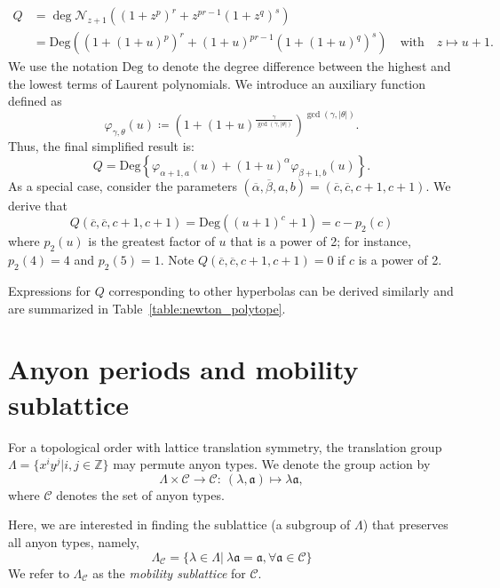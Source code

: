 \documentclass[aps,prl,english,superscriptaddress,twocolumn,tightenlines,showpacs,longbibliography,floatfix,amsfonts]{revtex4-2}
\begin{document}
\begin{align}
	Q &= \deg\mathcal{N}_{z+1}\left((1+z^p)^r+z^{pr-1}(1+z^q)^s\right) \\
	&= \text{Deg} \left((1+(1+u)^p)^r + (1+u)^{pr-1}(1+(1+u)^q)^s\right) \quad \text{with}\quad z \mapsto u+1.
\end{align}
We use the notation $\text{Deg}$ to denote the degree difference between the highest and the lowest terms of Laurent polynomials. We introduce an auxiliary function defined as
\begin{equation}
	\varphi_{\gamma,\theta}(u) \coloneqq \left(1+(1+u)^{\frac{\gamma}{\gcd(\gamma, |\theta|)}}\right)^{\gcd(\gamma, |\theta|)}.
\end{equation}
Thus, the final simplified result is:
\begin{equation}
	Q = \text{Deg}\left\{\varphi_{\alpha+1,a}(u)+(1+u)^\alpha\varphi_{\beta+1,b}(u)\right\}.
\end{equation}
As a special case, consider the parameters $(\overline{\alpha}, \overline{\beta}, a, b) = (\overline{c},\overline{c},c+1,c+1)$. We derive that
\begin{equation}
	Q(\overline{c},\overline{c},c+1,c+1)=\text{Deg}\left((u+1)^c+1\right) = c - p_2(c)
\end{equation}
where $p_2(u)$ is the greatest factor of $u$ that is a power of 2; for instance, $p_2(4)=4$ and $p_2(5)=1$. 
Note $Q(\overline{c},\overline{c},c+1,c+1)=0$ if $c$ is a power of 2.

Expressions for $Q$ corresponding to other hyperbolas can be derived similarly and are summarized in Table~\ref{table:newton_polytope}.


\section{Anyon periods and mobility sublattice}\label{app:anyon_periods}

For a topological order with lattice translation symmetry, the translation group $\Lambda=\{x^iy^j | i,j\in\mathbb{Z}\}$ may permute anyon types. We denote the group action by 
\begin{equation}
	\Lambda \times \mathscr{C} \to \mathscr{C}:\  (\lambda, \mathfrak{a}) \mapsto \lambda \mathfrak{a},
\end{equation}
where $\mathscr{C}$ denotes the set of anyon types. 

Here, we are interested in finding the sublattice (a subgroup of $\Lambda$) that preserves all anyon types, namely,
\begin{equation}
	\Lambda_\mathscr{C}=\{\lambda\in\Lambda|\ \lambda \mathfrak{a}=\mathfrak{a}, \forall \mathfrak{a}\in\mathscr{C}\}
\end{equation}
We refer to $\Lambda_{\mathscr{C}}$ as the \emph{mobility sublattice} for $\mathscr{C}$.
\end{document}
